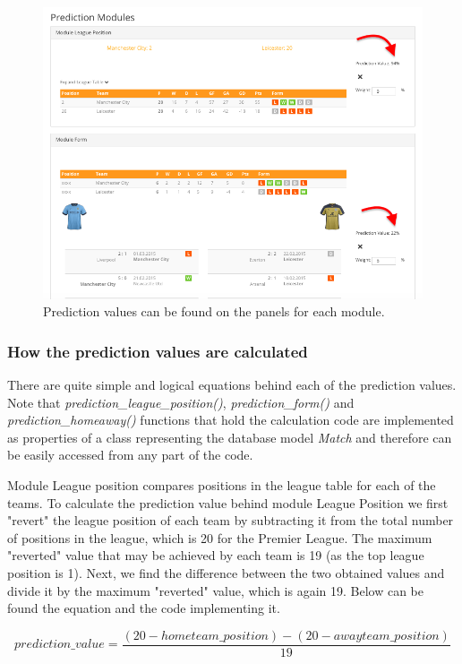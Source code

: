 \begin{figure}[H]
	\begin{center}
		\includegraphics[width=.80\textwidth]{impl/images/predictionValues}
		\caption{Prediction values can be found on the panels for each module.} \label{fig:using: predictionvalues}
	\end{center}
\end{figure}

\subsubsection*{How the prediction values are calculated}
There are quite simple and logical equations behind each of the prediction values. Note that \emph{prediction\_league\_position()}, \emph{prediction\_form()} and \emph{prediction\_homeaway()} functions that hold the calculation code are implemented as properties of a class representing the database model \emph{Match} and therefore can be easily accessed from any part of the code. 

Module League position compares positions in the league table for each of the teams. To calculate the prediction value behind module League Position we first "revert" the league position of each team by subtracting it from the total number of positions in the league, which is 20 for the Premier League. The maximum "reverted" value that may be achieved by each team is 19 (as the top league position is 1). Next, we find the difference between the two obtained values and divide it by the maximum "reverted" value, which is again 19.  Below can be found the equation and the code implementing it.

\begin{equation}
   prediction\_value = \frac{(20-hometeam\_position)-(20-awayteam\_position)}{19}
\end{equation}


